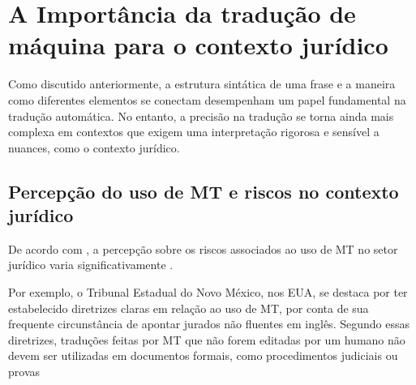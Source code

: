 


\section{A Importância da tradução de máquina para o contexto jurídico}

Como discutido anteriormente, a estrutura sintática de uma frase e a maneira como diferentes elementos se conectam desempenham um papel fundamental na tradução automática. No entanto, a precisão na tradução se torna ainda mais complexa em contextos que exigem uma interpretação rigorosa e sensível a nuances, como o contexto jurídico. 

\subsection{\textbf{Percepção do uso de MT e riscos no contexto jurídico}}
De acordo com , a percepção sobre os riscos associados ao uso de MT no setor jurídico varia significativamente \cite[p. 1522]{VHS}.

Por exemplo, o Tribunal Estadual do Novo México, nos EUA, se destaca por ter estabelecido diretrizes claras em relação ao uso de MT, por conta de sua frequente circunstância de apontar jurados não fluentes em inglês. Segundo essas diretrizes, traduções feitas por MT que não forem editadas por um humano não devem ser utilizadas em documentos formais, como procedimentos judiciais ou provas \cite[p. 323]{chavez}


